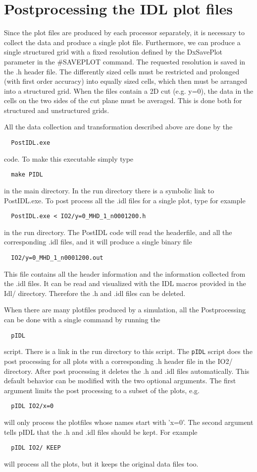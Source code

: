 \section{Postprocessing the IDL plot files \label{section:postidl}}

Since the plot files are produced by each processor separately, it is
necessary to collect the data and produce a single plot file. 
Furthermore, we can produce a single structured grid with a fixed 
resolution defined by the DxSavePlot parameter in the \#SAVEPLOT command.
The requested resolution is saved in the .h header file. 
The differently sized cells must be restricted and prolonged
(with first order accuracy) into equally sized cells, which then must be
arranged into a structured grid. When the files contain a 2D cut (e.g. y=0), 
the data in the cells on the two sides of the cut plane must be averaged.
This is done both for structured and unstructured grids.

All the data collection and transformation described above are done by the
\begin{verbatim}
  PostIDL.exe
\end{verbatim}
code. To make this executable simply type 
\begin{verbatim}
  make PIDL
\end{verbatim}
in the main directory. In the run directory there is a symbolic link
to PostIDL.exe. To post process all the .idl files for a single
plot, type for example
\begin{verbatim}
  PostIDL.exe < IO2/y=0_MHD_1_n0001200.h
\end{verbatim}
in the run directory. The PostIDL code will read the headerfile, and
all the corresponding .idl files, and it will produce a single binary file
\begin{verbatim}
  IO2/y=0_MHD_1_n0001200.out
\end{verbatim}
This file contains all the header information and the information collected
from the .idl files. It can be read and visualized with the IDL macros
provided in the Idl/ directory. Therefore the .h and .idl files can be
deleted.

When there are many plotfiles produced by a simulation, all the Postprocessing
can be done with a single command by running the
\begin{verbatim}
  pIDL
\end{verbatim}
script. There is a link in the run directory to this script. The {\tt pIDL} 
script does the post processing for all plots with a corresponding
.h header file in the IO2/ directory. After post processing it deletes the
.h and .idl files automatically. This default behavior can be modified
with the two optional arguments. The first argument limits the post processing
to a subset of the plots, e.g.
\begin{verbatim}
  pIDL IO2/x=0
\end{verbatim}
will only process the plotfiles whose names start with 'x=0'. The second
argument tells pIDL that the .h and .idl files should be kept. For example
\begin{verbatim}
  pIDL IO2/ KEEP
\end{verbatim}
will process all the plots, but it keeps the original data files too.

